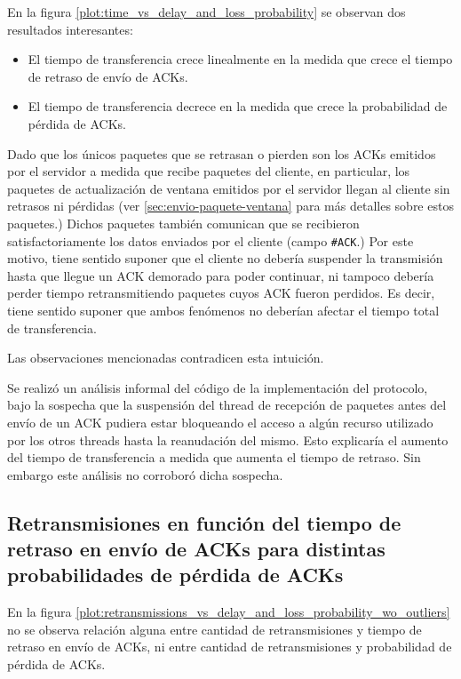 \documentclass[a4paper, 10pt, twoside]{article}
\newcommand{\ack}{\texttt{\#ACK}\xspace}
\begin{document}
En la figura \ref{plot:time_vs_delay_and_loss_probability} se observan dos resultados interesantes:

\begin{itemize}
  \item El tiempo de transferencia crece linealmente en la medida que crece el tiempo de retraso de envío de ACKs.

  \item El tiempo de transferencia decrece en la medida que crece la probabilidad de pérdida de ACKs.
\end{itemize}

Dado que los únicos paquetes que se retrasan o pierden son los ACKs emitidos por el servidor a medida que recibe paquetes del cliente, en particular, los paquetes de actualización de ventana emitidos por el servidor llegan al cliente sin retrasos ni pérdidas (ver \ref{sec:envio-paquete-ventana} para más detalles sobre estos paquetes.) Dichos paquetes también comunican que se recibieron satisfactoriamente los datos enviados por el cliente (campo \ack.) Por este motivo, tiene sentido suponer que el cliente no debería suspender la transmisión hasta que llegue un ACK demorado para poder continuar, ni tampoco debería perder tiempo retransmitiendo paquetes cuyos ACK fueron perdidos. Es decir, tiene sentido suponer que ambos fenómenos no deberían afectar el tiempo total de transferencia.

Las observaciones mencionadas contradicen esta intuición.

Se realizó un análisis informal del código de la implementación del protocolo, bajo la sospecha que la suspensión del thread de recepción de paquetes antes del envío de un ACK pudiera estar bloqueando el acceso a algún recurso utilizado por los otros threads hasta la reanudación del mismo. Esto explicaría el aumento del tiempo de transferencia a medida que aumenta el tiempo de retraso. Sin embargo este análisis no corroboró dicha sospecha.


\subsection{Retransmisiones en función del tiempo de retraso en envío de ACKs para distintas probabilidades de pérdida de ACKs}
\label{sec:retr_vs_delay_and_loss}

En la figura \ref{plot:retransmissions_vs_delay_and_loss_probability_wo_outliers} no se observa relación alguna entre cantidad de retransmisiones y tiempo de retraso en envío de ACKs, ni entre cantidad de retransmisiones y probabilidad de pérdida de ACKs.
\end{document}
